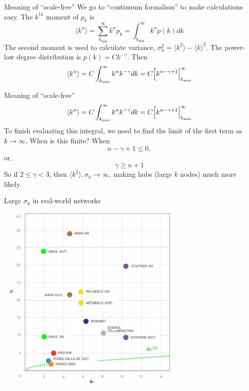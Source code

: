 \documentclass{beamer}
\begin{document}
\begin{frame}{Meaning of ``scale-free''}
  We go to ``continuum formalism'' to make calculations easy. The $k^{th}$
  moment of $p_k$ is
  \[
    \langle k^n \rangle = \sum_{k_{\min}}^\infty k^n p_k = 
      \int_{k_{\min}}^\infty k^n p(k) dk
  \]
  The second moment is used to calculate variance, 
  $\sigma_k^2 = \langle k^2 \rangle - \langle k \rangle^2$.
  \vspace{.5em}
  The power-law degree distribution is $p(k) = Ck^{-\gamma}$. Then
  \[
    \langle k^n \rangle = C \int_{k_{\min}}^\infty k^n k^{-\gamma} dk 
                        = C \Bigl[ k^{n - \gamma + 1} \Bigr|_{k_{\min}}^\infty
  \]
\end{frame}

\begin{frame}{Meaning of ``scale-free''}
  \[
    \langle k^n \rangle = C \int_{k_{\min}}^\infty k^n k^{-\gamma} dk 
                        = C \Bigl[ k^{n - \gamma + 1} \Bigr|_{k_{\min}}^\infty
  \]
  To finish evaluating this integral, we need to find the limit of the 
  first term as $k \to \infty$. When is this finite? When
  \[
    n - \gamma + 1 \le 0,
  \]
  or,
  \[
    \gamma \ge n + 1
  \]
  So if $2 \le \gamma < 3$, then $\langle k^2 \rangle, \sigma_k \to \infty$,
  making hubs (large $k$ nodes) much more likely.
\end{frame}

\begin{frame}{Large $\sigma_k$ in real-world networks}
  \vspace{-1em}
  \centering
  \includegraphics[width=0.7\textwidth]{Figures/largeStddevRealNetworks.jpg}
\end{frame}
\end{document}
